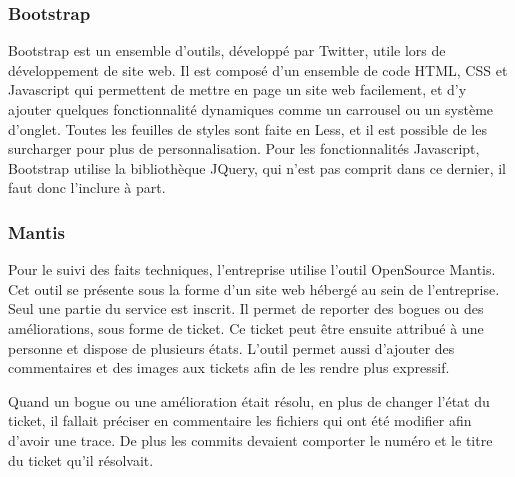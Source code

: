 \documentclass[12pt,a4paper]{article}
\begin{document}
\subsubsection{Bootstrap}
Bootstrap est un ensemble d'outils, développé par Twitter, utile lors de développement de site web. Il est composé d'un ensemble de code HTML, CSS et Javascript qui permettent de mettre en page un site web facilement, et d'y ajouter quelques fonctionnalité dynamiques comme un carrousel ou un système d'onglet. Toutes les feuilles de styles sont faite en Less, et il est possible de les surcharger pour plus de personnalisation. Pour les fonctionnalités Javascript, Bootstrap utilise la bibliothèque JQuery, qui n'est pas comprit dans ce dernier, il faut donc l'inclure à part.

\subsubsection{Mantis}
Pour le suivi des faits techniques, l'entreprise utilise l'outil OpenSource Mantis. Cet outil se présente sous la forme d'un site web hébergé au sein de l'entreprise. Seul une partie du service est inscrit. Il permet de reporter des bogues ou des améliorations, sous forme de ticket. Ce ticket peut être ensuite attribué à une personne et dispose de plusieurs états. L'outil permet aussi d'ajouter des commentaires et des images aux tickets afin de les rendre plus expressif.\par 
Quand un bogue ou une amélioration était résolu, en plus de changer l'état du ticket, il fallait préciser en commentaire les fichiers qui ont été modifier afin d'avoir une trace. De plus les commits devaient comporter le numéro et le titre du ticket qu'il résolvait.\par

\newpage
\end{document}
